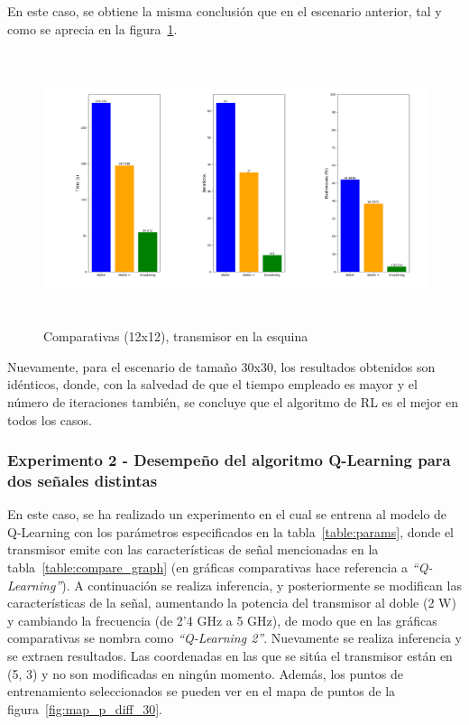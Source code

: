 En este caso, se obtiene la misma conclusión que en el escenario anterior, tal y como se aprecia en la figura~\ref{fig:comp_esq_12}.\\

\begin{figure} [t]
    \begin{center}
    \includegraphics[height=8cm]{imagenes/cap4/20_comp_esq_12.png}
    \end{center}
    \caption[Comparativas (12x12), transmisor en la esquina]{Comparativas (12x12), transmisor en la esquina}
    \label{fig:comp_esq_12}
\end{figure}

Nuevamente, para el escenario de tamaño 30x30, los resultados obtenidos son idénticos, donde, con la salvedad de que el tiempo empleado es mayor y el número de iteraciones también, se concluye que el algoritmo de \ac{RL} es el mejor en todos los casos.\\

\subsubsection{Experimento 2 - Desempeño del algoritmo Q-Learning para dos señales distintas}
\label{subsubsec:experimentos_1}

En este caso, se ha realizado un experimento en el cual se entrena al modelo de Q-Learning con los parámetros especificados en la tabla~\ref{table:params}, donde el transmisor emite con las características de señal mencionadas en la tabla~\ref{table:compare_graph} (en gráficas comparativas hace referencia a \emph{``Q-Learning''}). A continuación se realiza inferencia, y posteriormente se modifican las características de la señal, aumentando la potencia del transmisor al doble (2 W) y cambiando la frecuencia (de 2'4 GHz a 5 GHz), de modo que en las gráficas comparativas se nombra como \emph{``Q-Learning 2''}. Nuevamente se realiza inferencia y se extraen resultados. Las coordenadas en las que se sitúa el transmisor están en (5, 3) y no son modificadas en ningún momento. Además, los puntos de entrenamiento seleccionados se pueden ver en el mapa de puntos de la figura~\ref{fig:map_p_diff_30}.\\

